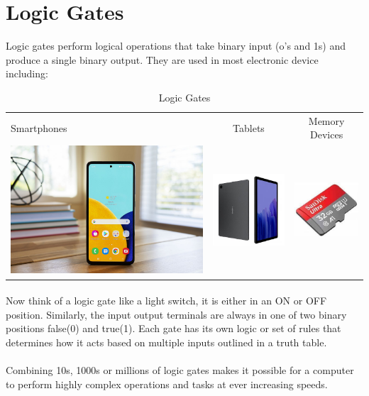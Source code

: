 \documentclass{article}
\begin{document}
\section{Logic Gates}
Logic gates perform logical operations that take binary input (o's and 1s) and produce a single binary output. They are used in most electronic device including:
\begin{table}[h!]
	\begin{center}
		\caption{Logic Gates}
		\label{tab:table1}
		\begin{tabular}{l c c}
			Smartphones
			&
			Tablets
			&
			Memory Devices
			\\
			\includegraphics[width=0.2\linewidth]{Picture2}
			&
			\includegraphics[width=0.25\linewidth]{Picture3}
			&
			\includegraphics[width=0.2\linewidth]{Picture4}
			\\
		\end{tabular}
	\end{center}
\end{table}

\paragraph{}
Now think of a logic gate like a light switch, it is either in an ON or OFF position. Similarly, the input output terminals are always in one of two binary positions false(0) and true(1). Each gate has its own logic or set of rules that determines how it acts based on multiple inputs outlined in a truth table.
\paragraph{}
Combining 10s, 1000s or millions of logic gates makes it possible for a computer to perform highly complex operations and tasks at ever increasing speeds.
\end{document}
